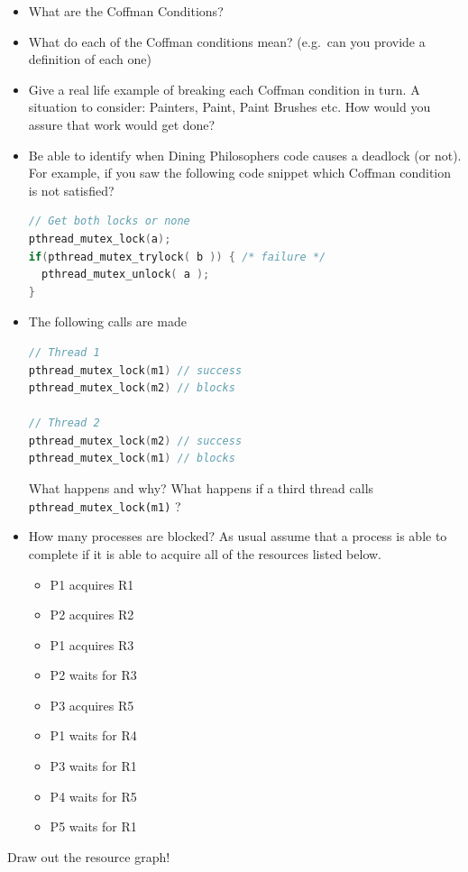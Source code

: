 \begin{itemize}
\item
  What are the Coffman Conditions?
\item
  What do each of the Coffman conditions mean? (e.g.~can you provide a definition of each one)
\item
  Give a real life example of breaking each Coffman condition in turn. A situation to consider: Painters, Paint, Paint Brushes etc. How would you assure that work would get done?
\item
  Be able to identify when Dining Philosophers code causes a deadlock (or not). For example, if you saw the following code snippet which Coffman condition is not satisfied?

\begin{lstlisting}[language=C]
// Get both locks or none
pthread_mutex_lock(a);
if(pthread_mutex_trylock( b )) { /* failure */
  pthread_mutex_unlock( a );
}
\end{lstlisting}
\item
  The following calls are made

\begin{lstlisting}[language=c]
// Thread 1
pthread_mutex_lock(m1) // success
pthread_mutex_lock(m2) // blocks

// Thread 2
pthread_mutex_lock(m2) // success
pthread_mutex_lock(m1) // blocks
\end{lstlisting}

  What happens and why? What happens if a third thread calls
  \texttt{pthread\_mutex\_lock(m1)} ?
\item
  How many processes are blocked? As usual assume that a process is able
  to complete if it is able to acquire all of the resources listed
  below.

  \begin{itemize}
  \tightlist
  \item
    P1 acquires R1
  \item
    P2 acquires R2
  \item
    P1 acquires R3
  \item
    P2 waits for R3
  \item
    P3 acquires R5
  \item
    P1 waits for R4
  \item
    P3 waits for R1
  \item
    P4 waits for R5
  \item
    P5 waits for R1
  \end{itemize}
\end{itemize}

Draw out the resource graph!



